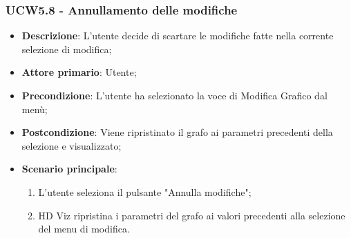 \subsubsection{UCW5.8 - Annullamento delle modifiche}
\label{ssub:ucw5.8}
\begin{itemize}
    \item \textbf{Descrizione}: L'utente decide di scartare le modifiche fatte nella corrente selezione di modifica;

    \item \textbf{Attore primario}: Utente;

    \item \textbf{Precondizione}:   L'utente ha selezionato la voce di Modifica Grafico dal menù;
    \item \textbf{Postcondizione}:  Viene ripristinato il grafo ai parametri precedenti della selezione e visualizzato;

    \item \textbf{Scenario principale}:
          \begin{enumerate}
              \item L'utente seleziona il pulsante "Annulla modifiche";
              \item HD Viz ripristina i parametri del grafo ai valori precedenti alla selezione del menu di modifica.
          \end{enumerate}
\end{itemize}
